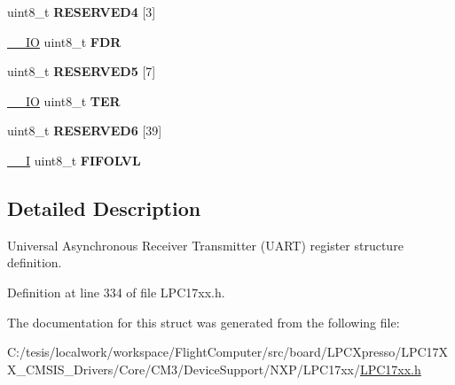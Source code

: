 \begin{DoxyCompactItemize}
\item 
\hypertarget{struct_l_p_c___u_a_r_t___type_def_ab2e7c1f79d81cbdc6e8f97d712974b6a}{uint8\-\_\-t {\bfseries \-R\-E\-S\-E\-R\-V\-E\-D4} \mbox{[}3\mbox{]}}\label{struct_l_p_c___u_a_r_t___type_def_ab2e7c1f79d81cbdc6e8f97d712974b6a}

\item 
\hypertarget{struct_l_p_c___u_a_r_t___type_def_a64c00ea759f830212bbd1680d05b9527}{\hyperlink{group___c_m_s_i_s__core__definitions_gaec43007d9998a0a0e01faede4133d6be}{\-\_\-\-\_\-\-I\-O} uint8\-\_\-t {\bfseries \-F\-D\-R}}\label{struct_l_p_c___u_a_r_t___type_def_a64c00ea759f830212bbd1680d05b9527}

\item 
\hypertarget{struct_l_p_c___u_a_r_t___type_def_ab4df110da4829f54d9b0a997197ebb2b}{uint8\-\_\-t {\bfseries \-R\-E\-S\-E\-R\-V\-E\-D5} \mbox{[}7\mbox{]}}\label{struct_l_p_c___u_a_r_t___type_def_ab4df110da4829f54d9b0a997197ebb2b}

\item 
\hypertarget{struct_l_p_c___u_a_r_t___type_def_a9669e26ff888ff51aad1218a052a7bcb}{\hyperlink{group___c_m_s_i_s__core__definitions_gaec43007d9998a0a0e01faede4133d6be}{\-\_\-\-\_\-\-I\-O} uint8\-\_\-t {\bfseries \-T\-E\-R}}\label{struct_l_p_c___u_a_r_t___type_def_a9669e26ff888ff51aad1218a052a7bcb}

\item 
\hypertarget{struct_l_p_c___u_a_r_t___type_def_a02f6e44a93ef057eb9094bb8e625598e}{uint8\-\_\-t {\bfseries \-R\-E\-S\-E\-R\-V\-E\-D6} \mbox{[}39\mbox{]}}\label{struct_l_p_c___u_a_r_t___type_def_a02f6e44a93ef057eb9094bb8e625598e}

\item 
\hypertarget{struct_l_p_c___u_a_r_t___type_def_abc7c1a66f6f9a77c2b22de6c1a4d4da4}{\hyperlink{group___c_m_s_i_s__core__definitions_gaf63697ed9952cc71e1225efe205f6cd3}{\-\_\-\-\_\-\-I} uint8\-\_\-t {\bfseries \-F\-I\-F\-O\-L\-V\-L}}\label{struct_l_p_c___u_a_r_t___type_def_abc7c1a66f6f9a77c2b22de6c1a4d4da4}

\end{DoxyCompactItemize}


\subsection{\-Detailed \-Description}
\-Universal \-Asynchronous \-Receiver \-Transmitter (\-U\-A\-R\-T) register structure definition. 

\-Definition at line 334 of file \-L\-P\-C17xx.\-h.



\-The documentation for this struct was generated from the following file\-:\begin{DoxyCompactItemize}
\item 
\-C\-:/tesis/localwork/workspace/\-Flight\-Computer/src/board/\-L\-P\-C\-Xpresso/\-L\-P\-C17\-X\-X\-\_\-\-C\-M\-S\-I\-S\-\_\-\-Drivers/\-Core/\-C\-M3/\-Device\-Support/\-N\-X\-P/\-L\-P\-C17xx/\hyperlink{_l_p_c17xx_8h}{\-L\-P\-C17xx.\-h}\end{DoxyCompactItemize}
